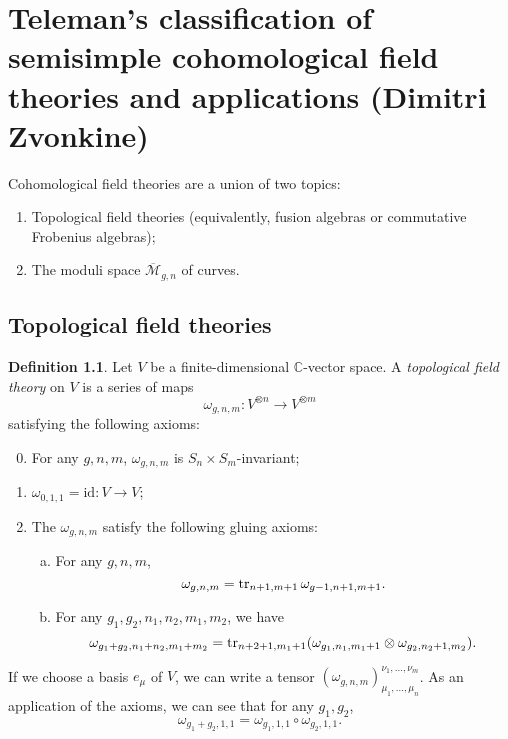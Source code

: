 \documentclass[leqno, openany]{memoir}
\theoremstyle{definition}
\newtheorem{defn}[thm]{Definition}
\theoremstyle{remark}
\theoremstyle{plain}
\theoremstyle{definition}
\theoremstyle{remark}
\newcommand{\C}{\mathbb{C}}
\newcommand{\mc}[1]{\mathcal{#1}}
\newcommand{\mr}[1]{\mathrm{#1}}
\newcommand{\ol}[1]{\overline{#1}}
\begin{document}
\chapter{Teleman's classification of semisimple cohomological field theories and applications (Dimitri Zvonkine)}
\label{cha:zvonkine}

Cohomological field theories are a union of two topics:
\begin{enumerate}
\item Topological field theories (equivalently, fusion algebras or commutative Frobenius algebras);
  \item The moduli space $\ol{\mc{M}}_{g,n}$ of curves.
\end{enumerate}

\section{Topological field theories}
\label{sec:tfts}

\begin{defn}
  Let $V$ be a finite-dimensional $\C$-vector space. A \textit{topological field theory} on $V$ is a series of maps
  \[ \omega_{g,n,m} \colon V^{\otimes n} \to V^{\otimes m} \]
  satisfying the following axioms:
  \begin{enumerate}
  \setcounter{enumi}{-1}
  \item For any $g,n,m$, $\omega_{g,n,m}$ is $S_n \times S_m$-invariant;
  \item $\omega_{0,1,1} = \mr{id} \colon V \to V$;
  \item The $\omega_{g,n,m}$ satisfy the following gluing axioms: \begin{enumerate}[(a)]
    \item For any $g,n,m$,
      \[ \omega_{g,n,m} = \tr_{n+1,m+1} \omega_{g-1,n+1,m+1}. \]
    \item For any $g_1,g_2,n_1,n_2,m_1,m_2$, we have
      \[ \omega_{g_1+g_2,n_1+n_2,m_1+m_2} = \tr_{n+2+1,m_1+1} (\omega_{g_1,n_1,m_1+1} \otimes \omega_{g_2,n_2+1,m_2}). \]
    \end{enumerate}
  \end{enumerate}
\end{defn}

If we choose a basis $e_{\mu}$ of $V$, we can write a tensor $(\omega_{g,n,m})^{\nu_1, \ldots, \nu_m}_{\mu_1,\ldots,\mu_n}$. As an application of the axioms, we can see that for any $g_1, g_2$,
\[ \omega_{g_1+g_2,1,1} = \omega_{g_1,1,1} \circ \omega_{g_2,1,1}. \]
\end{document}
